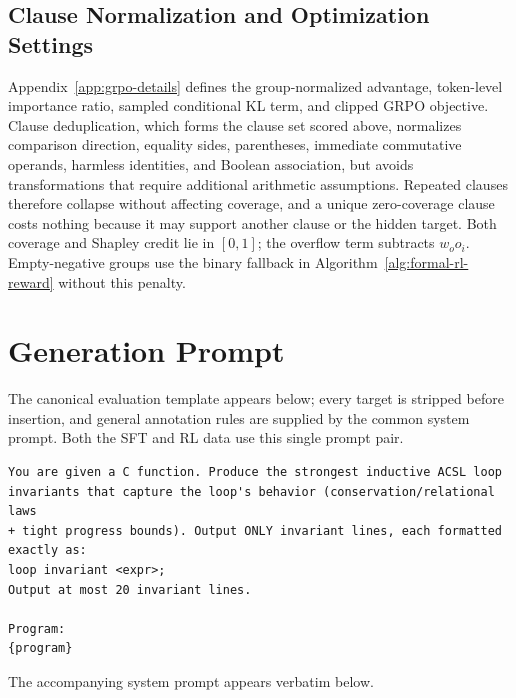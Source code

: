 \subsection{Clause Normalization and Optimization Settings}

Appendix~\ref{app:grpo-details} defines the group-normalized advantage,
token-level importance ratio, sampled conditional KL term, and clipped GRPO
objective.  Clause deduplication, which forms the clause set scored above,
normalizes comparison direction, equality sides, parentheses, immediate
commutative operands, harmless identities, and Boolean association, but
avoids transformations that require additional arithmetic assumptions.
Repeated clauses therefore collapse without affecting coverage, and a
unique zero-coverage clause costs nothing because it may support another
clause or the hidden target.  Both coverage and Shapley credit lie in
\([0,1]\); the overflow term subtracts \(w_o o_i\).  Empty-negative groups
use the binary fallback in Algorithm~\ref{alg:formal-rl-reward} without this
penalty.

\section{Generation Prompt}
\label{app:prompt}

The canonical evaluation template appears below; every target is
stripped before insertion, and general annotation rules are supplied
by the common system prompt.  Both the SFT and RL data use this single prompt
pair.

\begin{promptbox}
\begin{lstlisting}[style=promptstyle]
You are given a C function. Produce the strongest inductive ACSL loop
invariants that capture the loop's behavior (conservation/relational laws
+ tight progress bounds). Output ONLY invariant lines, each formatted
exactly as:
loop invariant <expr>;
Output at most 20 invariant lines.

Program:
{program}
\end{lstlisting}
\end{promptbox}

The accompanying system prompt appears verbatim below.

